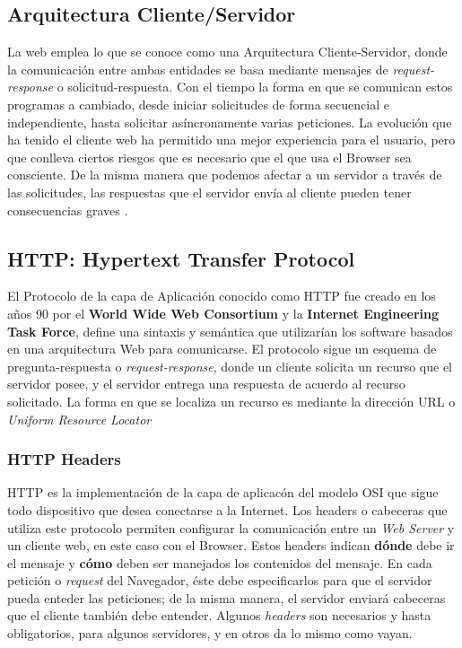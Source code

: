    \subsection{Arquitectura Cliente/Servidor}
    \label{chap2:ArqCS}
    La web emplea lo que se conoce como una Arquitectura Cliente-Servidor, donde la comunicación entre ambas entidades se basa mediante mensajes de \textit{request-response} o solicitud-respuesta. Con el tiempo la forma en que se comunican estos programas a cambiado, desde iniciar solicitudes de forma secuencial e independiente, hasta solicitar asíncronamente varias peticiones. La evolución que ha tenido el cliente web ha permitido una mejor experiencia para el usuario, pero que conlleva ciertos riesgos que es necesario que el que usa el Browser sea consciente. De la misma manera que podemos afectar a un servidor a través de las solicitudes, las respuestas que el servidor envía al cliente pueden tener consecuencias graves \cite{alcorn2014browser}.

    \subsection{HTTP: Hypertext Transfer Protocol}
    \label{chap2:HTTP}
    El Protocolo de la capa de Aplicación conocido como HTTP fue creado en los años 90 por el \textbf{World Wide Web Consortium} y la \textbf{Internet Engineering Task Force}, define una sintaxis y semántica que utilizarían los software basados en una arquitectura Web para comunicarse. El protocolo sigue un esquema de pregunta-respuesta o \textit{request-response}, donde un cliente solicita un recurso que el servidor posee, y el servidor entrega una respuesta de acuerdo al recurso solicitado. La forma en que se localiza un recurso es mediante la dirección URL o \textit{Uniform Resource Locator}

        \subsubsection{HTTP Headers}
        \label{chap2:headers}
        HTTP es la implementación de la capa de aplicacón del modelo OSI que sigue todo dispositivo que desea conectarse a la Internet. Los headers o cabeceras que utiliza este protocolo permiten configurar la comunicación entre un \textit{Web Server} y un cliente web, en este caso con el Browser. Estos headers indican \textbf{dónde} debe ir el mensaje y \textbf{cómo} deben ser manejados los contenidos del mensaje. En cada petición o \textit{request} del Navegador, éste debe especificarlos para que el servidor pueda enteder las peticiones; de la misma manera, el servidor enviará cabeceras que el cliente también debe entender. Algunos \textit{headers} son necesarios y hasta obligatorios, para algunos servidores, y en otros da lo mismo como vayan.

